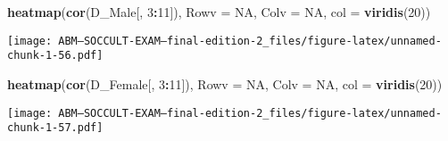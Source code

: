 \documentclass[]{article}
\newenvironment{Shaded}{\begin{snugshade}}{\end{snugshade}}
\newcommand{\KeywordTok}[1]{\textcolor[rgb]{0.13,0.29,0.53}{\textbf{#1}}}
\newcommand{\DataTypeTok}[1]{\textcolor[rgb]{0.13,0.29,0.53}{#1}}
\newcommand{\DecValTok}[1]{\textcolor[rgb]{0.00,0.00,0.81}{#1}}
\newcommand{\StringTok}[1]{\textcolor[rgb]{0.31,0.60,0.02}{#1}}
\newcommand{\CommentTok}[1]{\textcolor[rgb]{0.56,0.35,0.01}{\textit{#1}}}
\newcommand{\OtherTok}[1]{\textcolor[rgb]{0.56,0.35,0.01}{#1}}
\newcommand{\OperatorTok}[1]{\textcolor[rgb]{0.81,0.36,0.00}{\textbf{#1}}}
\newcommand{\AlertTok}[1]{\textcolor[rgb]{0.94,0.16,0.16}{#1}}
\newcommand{\NormalTok}[1]{#1}
\begin{document}
\begin{Shaded}
\begin{Highlighting}[]
\KeywordTok{heatmap}\NormalTok{(}\KeywordTok{cor}\NormalTok{(D_Male[, }\DecValTok{3}\OperatorTok{:}\DecValTok{11}\NormalTok{]), }\DataTypeTok{Rowv =} \OtherTok{NA}\NormalTok{, }\DataTypeTok{Colv =} \OtherTok{NA}\NormalTok{, }\DataTypeTok{col =} \KeywordTok{viridis}\NormalTok{(}\DecValTok{20}\NormalTok{))}
\end{Highlighting}
\end{Shaded}

\texttt{[image: ABM---SOCCULT-EXAM---final-edition-2\_files/figure-latex/unnamed-chunk-1-56.pdf]}

\begin{Shaded}
\begin{Highlighting}[]
\KeywordTok{heatmap}\NormalTok{(}\KeywordTok{cor}\NormalTok{(D_Female[, }\DecValTok{3}\OperatorTok{:}\DecValTok{11}\NormalTok{]), }\DataTypeTok{Rowv =} \OtherTok{NA}\NormalTok{, }\DataTypeTok{Colv =} \OtherTok{NA}\NormalTok{, }\DataTypeTok{col =} \KeywordTok{viridis}\NormalTok{(}\DecValTok{20}\NormalTok{))}
\end{Highlighting}
\end{Shaded}

\texttt{[image: ABM---SOCCULT-EXAM---final-edition-2\_files/figure-latex/unnamed-chunk-1-57.pdf]}

\begin{Shaded}
\end{Shaded}
\end{document}

